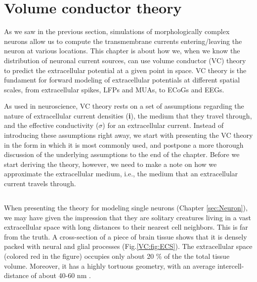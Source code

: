 \section{Volume conductor theory}
\label{sec:VC}
As we saw in the previous section, simulations of morphologically complex neurons allow us to compute the transmembrane currents entering/leaving the neuron at various locations. This chapter is about how we, when we know the distribution of neuronal current sources, can use volume conductor (VC) theory to predict the extracellular potential at a given point in space. VC theory is the fundament for forward modeling of extracellular potentials at different spatial scales, from extracellular spikes, LFPs and MUAs, to ECoGs and EEGs.

As used in neuroscience, VC theory rests on a set of assumptions regarding the nature of extracellular current densities ({\bf i}), the medium that they travel through, and the effective conductivity ($\sigma$)  for an extracellular current. Instead of introducing these assumptions right away, we start with presenting the VC theory in the form in which it is most commonly used, and postpone a more thorough discussion of the underlying assumptions to the end of the chapter. Before we start deriving the theory, however, we need to make a note on how we approximate the extracellular medium, i.e., the medium that an extracellular current travels through.


\subsection{}
\label{sec:VC:continuous}

When presenting the theory for modeling single neurons (Chapter \ref{sec:Neuron}), we may have given the impression that they are solitary creatures living in a vast extracellular space with long distances to their nearest cell neighbors. This is far from the truth. A cross-section of a piece of brain tissue shows that it is densely packed with neural and glial processes  (Fig.\ref{VC:fig:ECS}). The extracellular space (colored red in the figure) occupies only about 20 \% of the the total tissue volume. Moreover, it has a highly tortuous  geometry, with an average intercell-distance of about 40-60 nm \citep{Sykova2008}. 

